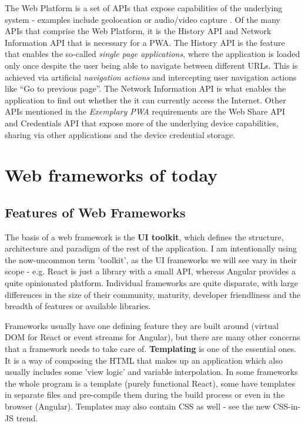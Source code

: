 \documentclass[english,odsaz]{fitthesis}
\begin{document}
The Web Platform is a set of APIs that expose capabilities of the underlying
system - examples include geolocation or audio/video capture
\cite{what_web_can_do}. Of the many APIs that comprise the Web Platform, it is the
History API and Network Information API that is necessary for a PWA. The History
API is the feature that enables the so-called \emph{single page applications}, where
the application is loaded only once despite the user being able to navigate
between different URLs. This is achieved via artificial \emph{navigation actions} and
intercepting user navigation actions like ``Go to previous page''. The Network
Information API is what enables the application to find out whether the it can
currently access the Internet. Other APIs mentioned in the \emph{Exemplary PWA}
requirements are the Web Share API and Credentials API that expose more of the
underlying device capabilities, sharing via other applications and the device
credential storage.

\chapter{Web frameworks of today}
\label{sec:org66cb6fa}
\section{Features of Web Frameworks}
\label{sec:orgd81e395}
The basis of a web framework is the \textbf{UI toolkit}, which defines the structure,
architecture and paradigm of the rest of the application. I am intentionally
using the now-uncommon term 'toolkit', as the UI frameworks we will see vary in
their scope - e.g. React is just a library with a small API, whereas Angular
provides a quite opinionated platform. Individual frameworks are quite
disparate, with large differences in the size of their community, maturity,
developer friendliness and the breadth of features or available libraries.

Frameworks usually have one defining feature they are built around (virtual DOM
for React or event streams for Angular), but there are many other concerns that
a framework needs to take care of. \textbf{Templating} is one of the essential ones. It
is a way of composing the HTML that makes up an application which also usually
includes some 'view logic' and variable interpolation. In some frameworks the
whole program is a template (purely functional React), some have templates in
separate files and pre-compile them during the build process or even in the
browser (Angular). Templates may also contain CSS as well - see the new
CSS-in-JS trend.
\end{document}
